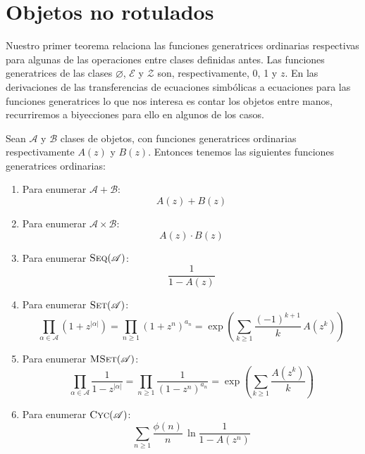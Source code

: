 \section{Objetos no rotulados}
\label{sec:objetos-no-rotulados}

  Nuestro primer teorema
  relaciona las funciones generatrices ordinarias
  respectivas para algunas de las operaciones entre clases
  definidas antes.
  Las funciones generatrices de las clases \(\varnothing\),
  \(\mathscr{E}\) y \(\mathscr{Z}\)
  son,
  respectivamente,
  \num{0}, \num{1} y \(z\).
  En las derivaciones
  de las transferencias de ecuaciones simbólicas
  a ecuaciones para las funciones generatrices
  lo que nos interesa es contar los objetos entre manos,
  recurriremos a biyecciones para ello en algunos de los casos.
  \begin{theorem}
    \label{theo:ms-OGF}
    Sean \(\mathscr{A}\) y \(\mathscr{B}\) clases de objetos,
    con funciones generatrices ordinarias
    respectivamente \(A(z)\) y \(B(z)\).
    Entonces tenemos
    las siguientes funciones generatrices ordinarias:
    \begin{enumerate}
    \item
      Para enumerar \(\mathscr{A} + \mathscr{B}\):
      \begin{equation*}
        A(z) + B(z)
      \end{equation*}
    \item
      Para enumerar \(\mathscr{A} \times \mathscr{B}\):
      \begin{equation*}
        A(z) \cdot B(z)
      \end{equation*}
    \item
      Para enumerar \(\operatorname{\textsc{Seq}}(\mathscr{A})\):
      \begin{equation*}
        \frac{1}{1 - A(z)}
      \end{equation*}
    \item
      Para enumerar \(\operatorname{\textsc{Set}}(\mathscr{A})\):
      \begin{equation*}
        \prod_{\alpha \in \mathscr{A}}
           \left( 1 + z^{\lvert \alpha \rvert} \right)
          = \prod_{n \ge 1} (1 + z^n)^{a_n}
          = \exp \left(
                   \sum_{k \ge 1} \frac{(-1)^{k + 1}}{k} \, A(z^k)
                 \right)
      \end{equation*}
    \item
      Para enumerar \(\operatorname{\textsc{MSet}}(\mathscr{A})\):
      \begin{equation*}
        \prod_{\alpha \in \mathscr{A}}
           \frac{1}{1 - z^{\lvert \alpha \rvert}}
          = \prod_{n \ge 1} \frac{1}{(1 - z^n)^{a_n}}
          = \exp\left(
                   \sum_{k \ge 1} \frac{A(z^k)}{k}
                \right)
      \end{equation*}
    \item
      Para enumerar \(\operatorname{\textsc{Cyc}}(\mathscr{A})\):
      \begin{equation*}
        \sum_{n \ge 1} \frac{\phi(n)}{n} \, \ln \frac{1}{1 - A(z^n)}
      \end{equation*}
    \end{enumerate}
  \end{theorem}
